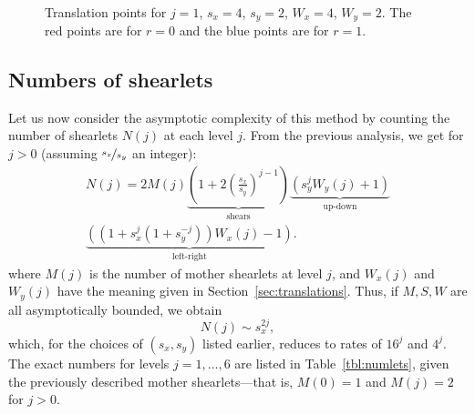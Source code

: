 \begin{figure}
\centering
{} \\
\caption{Translation points for $j=1$, $s_x=4$, $s_y=2$, $W_x=4$, $W_y=2$. The red points are for $r=0$ and
the blue points are for $r=1$.}
\label{fig:translations} 
\end{figure}

\subsection{Numbers of shearlets}

Let us now consider the asymptotic complexity of this method by counting the number of shearlets $N(j)$ at
each level $j$. From the previous analysis, we get for $j>0$ (assuming $\nicefrac{s_x}{s_y}$ an integer):
\begin{multline*}
    N(j) = 2 M(j)
           \underbrace{\left(1+2\left(\frac{s_x}{s_y}\right)^{j-1}\right)}_{\text{shears}}
           \underbrace{\left(s_y^jW_y(j) + 1\right)}_{\text{up-down}} \\
           \underbrace{\left(\left(1+s_x^j\left(1+s_y^{-j}\right)\right)W_x(j)-1\right)}_{\text{left-right}}.
\end{multline*}
where $M(j)$ is the number of mother shearlets at level $j$, and $W_x(j)$ and $W_y(j)$ have the meaning given
in Section~\ref{sec:translations}. Thus, if $M,S,W$ are all asymptotically bounded, we obtain
\[
    N(j) \sim s_x^{2j},
\]
which, for the choices of $(s_x,s_y)$ listed earlier, reduces to rates of $16^j$ and $4^j$. The exact numbers
for levels $j=1,\ldots,6$ are listed in Table~\ref{tbl:numlets}, given the previously described mother
shearlets---that is, $M(0)=1$ and $M(j)=2$ for $j>0$.

